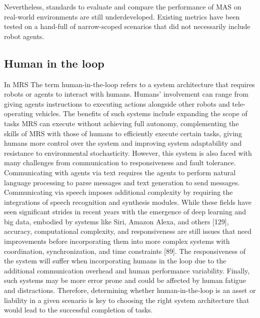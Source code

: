 \documentclass{article}
\begin{document}
					Nevertheless, standards to evaluate and compare the performance of MAS on real-world environments are still underdeveloped. Existing metrics have been tested on a hand-full of narrow-scoped scenarios that did not necessarily include robot agents.
				
				\subsection{Human in the loop}
				In MRS The term human-in-the-loop refers to a system architecture that requires robots or agents to interact with humans. Humans’ involvement can range from giving agents instructions to executing actions alongside other robots and tele-operating vehicles. The benefits of such systems include expanding the scope of tasks MRS can execute without achieving full autonomy, complementing the skills of MRS with those of humans to efficiently execute certain tasks, giving humans more control over the system and improving system adaptability and resistance to environmental stochasticity. However, this system is also faced with many challenges from communication to responsiveness and fault tolerance. Communicating with agents via text requires the agents to perform natural language processing to parse messages and text generation to send messages. Communicating via speech imposes additional complexity by requiring the integrations of speech recognition and synthesis modules. While these fields have seen significant strides in recent years with the emergence of deep learning and big data, embodied by systems like Siri, Amazon Alexa,
				and others \cite{rizk-2019-cooperative-heterogeneous-multi-robot-systems-a-survey}[129], accuracy, computational complexity, and responsiveness are still issues that need improvements before incorporating them into more complex systems with coordination, synchronization, and time constraints \cite{rizk-2019-cooperative-heterogeneous-multi-robot-systems-a-survey}[89]. The responsiveness of the system will suffer when incorporating humans in the loop due to the additional communication overhead and human performance variability. Finally, such systems may be more error prone and could be affected by human fatigue and distractions. Therefore, determining whether human-in-the-loop is an asset or liability in a given scenario is key to choosing the right system architecture that would lead to the successful completion of tasks.
				
				
\end{document}
